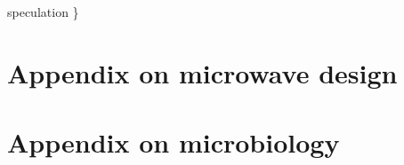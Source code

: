 \documentclass[fleqn,10pt]{article}
\begin{document}
{\color{red} speculation \} } 









%








\section{Appendix on microwave design}



\section{Appendix on microbiology}









\nocite{*}

\end{document}
